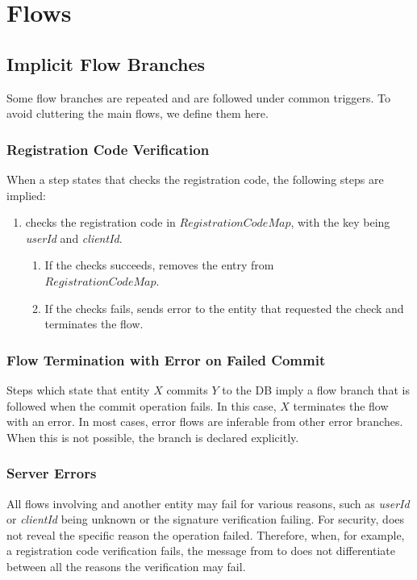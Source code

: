 \documentclass[a4paper,10pt]{article}
\newcommand{\userId}{\emph{userId}}
\newcommand{\clientId}{\emph{clientId}}
\begin{document}
\section{Flows}

\subsection{Implicit Flow Branches}
Some flow branches are repeated and are followed under common triggers. To avoid cluttering the main flows, we define them here.

\subsubsection{Registration Code Verification}
When a step states that \Server{} checks the registration code, the following steps are implied:

\begin{enumerate}
 \item \Server{} checks the registration code in $RegistrationCodeMap$, with the key being \userId{} and \clientId{}.
 \begin{enumerate}
  \item If the checks succeeds, \Server{} removes the entry from\\$RegistrationCodeMap$.
  \item If the checks fails, \Server{} sends error to the entity that requested the check and terminates the flow.
 \end{enumerate}
\end{enumerate}

\subsubsection{Flow Termination with Error on Failed Commit}
Steps which state that entity $X$ commits $Y$ to the DB imply a flow branch that is followed when the commit operation fails. In this case, $X$ terminates the flow with an error. 
In most cases, error flows are inferable from other error branches. When this is not possible, the branch is declared explicitly. 

\subsubsection{Server Errors}
All flows involving \Server{} and another entity may fail for various reasons, such as \userId{} or \clientId{} being unknown or the signature verification failing. For security, 
\Server{} does not reveal the specific reason the operation failed. Therefore, when, for example, a registration code verification fails, the message from \Server{} to \Client{} 
does not differentiate between all the reasons the verification may fail.
\end{document}
